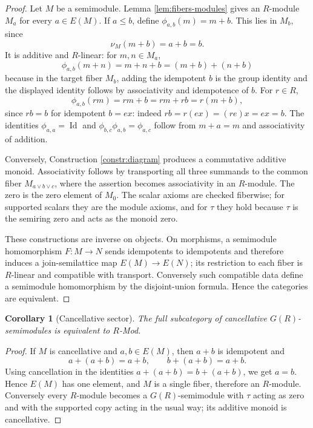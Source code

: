 \documentclass[11pt]{article}
\newcommand{\Id}{\operatorname{Id}}
\theoremstyle{plain}
\newtheorem{corollary}[theorem]{Corollary}
\theoremstyle{definition}
\numberwithin{equation}{section}
\begin{document}
\begin{proof}
Let \(M\) be a semimodule.  Lemma \ref{lem:fibers-modules} gives an \(R\)-module \(M_a\) for every \(a\in E(M)\).  If \(a\le b\), define \(\phi_{a,b}(m)=m+b\).  This lies in \(M_b\), since
\[
 \nu_M(m+b)=a+b=b.
\]
It is additive and \(R\)-linear: for \(m,n\in M_a\),
\[
 \phi_{a,b}(m+n)=m+n+b=(m+b)+(n+b)
\]
because in the target fiber \(M_b\), adding the idempotent \(b\) is the group identity and the displayed identity follows by associativity and idempotence of \(b\).  For \(r\in R\),
\[
 \phi_{a,b}(rm)=rm+b=rm+rb=r(m+b),
\]
since \(rb=b\) for idempotent \(b=e x\): indeed \(rb=r(e x)=(re)x=ex=b\).  The identities \(\phi_{a,a}=\Id\) and \(\phi_{b,c}\phi_{a,b}=\phi_{a,c}\) follow from \(m+a=m\) and associativity of addition.

Conversely, Construction \ref{constr:diagram} produces a commutative additive monoid.  Associativity follows by transporting all three summands to the common fiber \(M_{a\vee b\vee c}\), where the assertion becomes associativity in an \(R\)-module.  The zero is the zero element of \(M_0\).  The scalar axioms are checked fiberwise; for supported scalars they are the module axioms, and for \(\tau\) they hold because \(\tau\) is the semiring zero and acts as the monoid zero.

These constructions are inverse on objects.  On morphisms, a semimodule homomorphism \(F:M\to N\) sends idempotents to idempotents and therefore induces a join-semilattice map \(E(M)\to E(N)\); its restriction to each fiber is \(R\)-linear and compatible with transport.  Conversely such compatible data define a semimodule homomorphism by the disjoint-union formula.  Hence the categories are equivalent.
\end{proof}

\begin{corollary}[Cancellative sector]\label{cor:cancellative}
The full subcategory of cancellative \(G(R)\)-semimodules is equivalent to \(R\)-Mod.
\end{corollary}

\begin{proof}
If \(M\) is cancellative and \(a,b\in E(M)\), then \(a+b\) is idempotent and
\[
 a+(a+b)=a+b,
 \qquad
 b+(a+b)=a+b.
\]
Using cancellation in the identities \(a+(a+b)=b+(a+b)\), we get \(a=b\).  Hence \(E(M)\) has one element, and \(M\) is a single fiber, therefore an \(R\)-module.  Conversely every \(R\)-module becomes a \(G(R)\)-semimodule with \(\tau\) acting as zero and with the supported copy acting in the usual way; its additive monoid is cancellative.
\end{proof}
\end{document}
